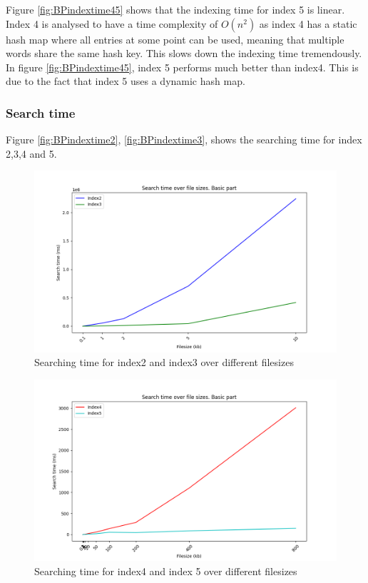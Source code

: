 Figure \ref{fig:BPindextime45} shows that the indexing time for index 5 is linear. Index 4 is analysed to have a time complexity of $O(n^2)$ as index 4 has a static hash map where all entries at some point can be used, meaning that multiple words share the same hash key. This slows down the indexing time tremendously. In figure \ref{fig:BPindextime45}, index 5 performs much better than index4. This is due to the fact that index 5 uses a dynamic hash map. 

\subsubsection{Search time}
Figure \ref{fig:BPindextime2}, \ref{fig:BPindextime3}, shows the searching time for index 2,3,4 and 5.

\begin{figure}[H]
    \centering
    \includegraphics[width=.8\textwidth]{LaTeX/Figures/BasicPart/BPSearch[2, 3].png}
    \caption{Searching time for index2 and index3 over different filesizes}
    \label{fig:BPsearch23}
\end{figure}

\begin{figure}[H]
    \centering
    \includegraphics[width=.8\textwidth]{LaTeX/Figures/BasicPart/BPSearch[4, 5].png}
    \caption{Searching time for index4 and index 5 over different filesizes}
    \label{fig:BPsearch45}
\end{figure}


